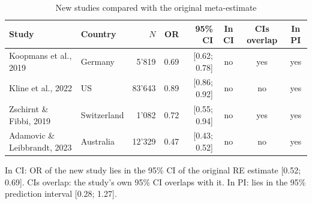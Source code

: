 \begin{table}[htbp]
\centering
\small
\caption{New studies compared with the original meta-estimate}
\label{tab:update-new}
\begin{tabular}{llrrrccc}
\toprule
Study & Country & $N$ & OR & 95\% CI & In CI & CIs overlap & In PI \\
\midrule
Koopmans et al., 2019 & Germany & 5'819 & 0.69 & [0.62; 0.78] & no & yes & yes \\
Kline et al., 2022 & US & 83'643 & 0.89 & [0.86; 0.92] & no & no & yes \\
Zschirnt \& Fibbi, 2019 & Switzerland & 1'082 & 0.72 & [0.55; 0.94] & no & yes & yes \\
Adamovic \& Leibbrandt, 2023 & Australia & 12'329 & 0.47 & [0.43; 0.52] & no & no & yes \\
\bottomrule
\end{tabular}
\par\smallskip\parbox{0.95\linewidth}{\footnotesize In CI: OR of the new study lies in the 95\% CI of the original RE estimate [0.52; 0.69]. CIs overlap: the study's own 95\% CI overlaps with it. In PI: lies in the 95\% prediction interval [0.28; 1.27].}
\end{table}

